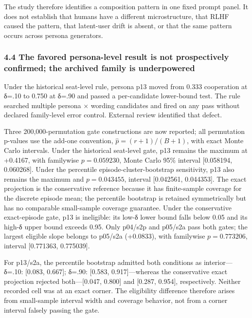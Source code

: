 \documentclass[
  11pt]{article}
\begin{document}
The study therefore identifies a composition pattern in one fixed prompt
panel. It does not establish that humans have a different
microstructure, that RLHF caused the pattern, that latent-user drift is
absent, or that the same pattern occurs across persona generators.

\subsubsection{4.4 The favored persona-level result is not prospectively
confirmed; the archived family is
underpowered}\label{the-favored-persona-level-result-is-not-prospectively-confirmed-the-archived-family-is-underpowered}

Under the historical seat-level rule, persona p13 moved from 0.333
cooperation at δ=.10 to 0.750 at δ=.90 and passed a per-candidate
lower-bound test. The rule searched multiple persona × wording
candidates and fired on any pass without declared family-level error
control. External review identified that defect.

Three 200,000-permutation gate constructions are now reported; all
permutation p-values use the add-one convention,
\(\widehat p=(r+1)/(B+1)\), with exact Monte Carlo intervals. Under the
historical seat-level gate, p13 remains the maximum at +0.4167, with
familywise \(p=0.059230\), Monte Carlo 95\% interval {[}0.058194,
0.060268{]}. Under the percentile episode-cluster-bootstrap sensitivity,
p13 also remains the maximum and \(p=0.043455\), interval {[}0.042561,
0.044353{]}. The exact projection is the conservative reference because
it has finite-sample coverage for the discrete episode mean; the
percentile bootstrap is retained symmetrically but has no comparable
small-sample coverage guarantee. Under the conservative exact-episode
gate, p13 is ineligible: its low-δ lower bound falls below 0.05 and its
high-δ upper bound exceeds 0.95. Only p04/s2p and p05/s2a pass both
gates; the largest eligible slope belongs to p05/s2a (+0.0833), with
familywise \(p=0.773206\), interval {[}0.771363, 0.775039{]}.

For p13/s2a, the percentile bootstrap admitted both conditions as
interior---δ=.10: {[}0.083, 0.667{]}; δ=.90: {[}0.583,
0.917{]}---whereas the conservative exact projection rejected
both---{[}0.047, 0.800{]} and {[}0.287, 0.954{]}, respectively. Neither
recorded cell was at an exact corner. The eligibility difference
therefore arises from small-sample interval width and coverage behavior,
not from a corner interval falsely passing the gate.
\end{document}
